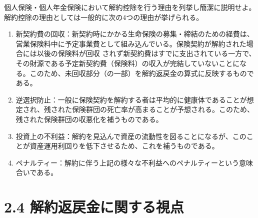 \documentclass[report,gutter=10mm,fore-edge=10mm,uplatex,dvipdfmx]{jlreq}
\begin{document}
個人保険・個人年金保険において解約控除を行う理由を列挙し簡潔に説明せよ。
解約控除の理由としては一般的に次の4つの理由が挙げられる。
\begin{enumerate}
\item 新契約費の回収：新契約時にかかる生命保険の募集・締結のための経費は、営業保険料中に予定事業費として組み込んでいる。保険契約が解約された場合には以後の保険料が回収
  されず新契約費はすでに支出されている一方で、その財源である予定新契約費（保険料）の収入が完結していないことになる。このため、未回収部分（の一部）を解約返戻金の算式に反映するものである。
\item 逆選択防止：一般に保険契約を解約する者は平均的に健康体であることが想定され、残された保険群団の死亡率が高まることが予想される。このため、残された保険群団の収悪化を補うものである。
\item 投資上の不利益：解約を見込んで資産の流動性を図ることになるが、このことが資産運用利回りを低下させるため、これを補うものである。
\item ペナルティー：解約に伴う上記の様々な不利益へのペナルティーという意味合いである。
\end{enumerate}

\section{2.4 解約返戻金に関する視点}
\end{document}
